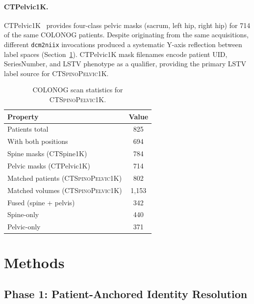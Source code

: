 \documentclass[pmlr]{jmlr}
\newcommand{\dataset}{\textsc{CTSpinoPelvic1K}}
\begin{document}
\paragraph{CTPelvic1K.}
CTPelvic1K~\citep{Liu2021DeepModels} provides four-class pelvic
masks (sacrum, left hip, right hip) for 714 of the same COLONOG
patients.
Despite originating from the same acquisitions, different
\texttt{dcm2niix} invocations produced a systematic Y-axis
reflection between label spaces (Section~\ref{sec:methods}).
CTPelvic1K mask filenames encode patient UID, SeriesNumber, and
LSTV phenotype as a qualifier, providing the primary LSTV label
source for \dataset{}.

\begin{table}[t]
  {\caption{COLONOG scan statistics for \dataset{}.}}
  {\small\begin{tabular}{lc}
  \toprule
  \bfseries Property & \bfseries Value \\
  \midrule
  Patients total                  & 825 \\
  \quad With both positions       & 694 \\
  Spine masks (CTSpine1K)         & 784 \\
  Pelvic masks (CTPelvic1K)       & 714 \\
  Matched patients (\dataset{})   & 802 \\
  Matched volumes (\dataset{})    & 1{,}153 \\
  \quad Fused (spine + pelvis)    & 342 \\
  \quad Spine-only                & 440 \\
  \quad Pelvic-only               & 371 \\
  \bottomrule
  \end{tabular}}
\end{table}

\section{Methods}
\label{sec:methods}

\subsection{Phase 1: Patient-Anchored Identity Resolution}
\label{sec:patientdb}
\end{document}
